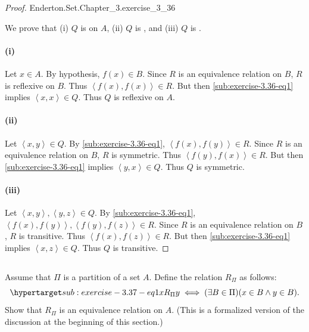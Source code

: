 \documentclass{report}
\newcommand{\pair}[1]{\left< #1 \right>}
\begin{document}
\begin{proof}

    {Enderton.Set.Chapter\_3.exercise\_3\_36}

  We prove that (i) $Q$ is  on $A$, (ii) $Q$ is
    , and (iii) $Q$ is .

  \paragraph{(i)}%

    Let $x \in A$.
    By hypothesis, $f(x) \in B$.
    Since $R$ is an equivalence relation on $B$, $R$ is reflexive on $B$.
    Thus $\pair{f(x), f(x)} \in R$.
    But then \eqref{sub:exercise-3.36-eq1} implies $\pair{x, x} \in Q$.
    Thus $Q$ is reflexive on $A$.

  \paragraph{(ii)}%

    Let $\pair{x, y} \in Q$.
    By \eqref{sub:exercise-3.36-eq1}, $\pair{f(x), f(y)} \in R$.
    Since $R$ is an equivalence relation on $B$, $R$ is symmetric.
    Thus $\pair{f(y), f(x)} \in R$.
    But then \eqref{sub:exercise-3.36-eq1} implies $\pair{y, x} \in Q$.
    Thus $Q$ is symmetric.

  \paragraph{(iii)}%

    Let $\pair{x, y}, \pair{y, z} \in Q$.
    By \eqref{sub:exercise-3.36-eq1},
      $\pair{f(x), f(y)}, \pair{f(y), f(z)} \in R$.
    Since $R$ is an equivalence relation on $B$, $R$ is transitive.
    Thus $\pair{f(x), f(z)} \in R$.
    But then \eqref{sub:exercise-3.36-eq1} implies $\pair{x, z} \in Q$.
    Thus $Q$ is transitive.

\end{proof}

\subsection{}%

Assume that $\Pi$ is a partition of a set $A$.
Define the relation $R_\Pi$ as follows:
  \begin{equation}
    \hyperlabel{sub:exercise-3.37-eq1}
    xR_{\Pi}y \iff (\exists B \in \Pi)(x \in B \land y \in B).
  \end{equation}
Show that $R_\Pi$ is an equivalence relation on $A$.
(This is a formalized version of the discussion at the beginning of this
  section.)
\end{document}
